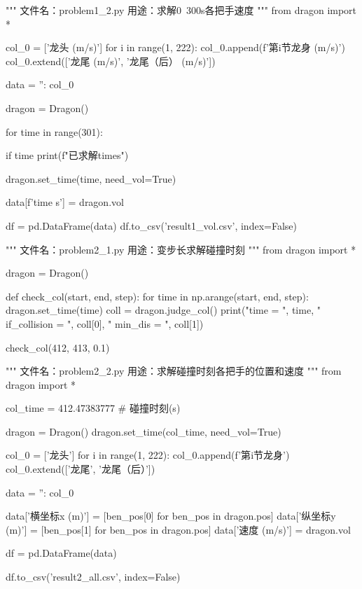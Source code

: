 \documentclass[withoutpreface,bwprint]{cumcmthesis}
\begin{document}
\begin{CodeText}
"""
文件名：problem1_2.py
用途：求解0~300s各把手速度
"""
from dragon import *

col_0 = ['龙头 (m/s)']
for i in range(1, 222):
      col_0.append(f'第{i}节龙身 (m/s)')
col_0.extend(['龙尾 (m/s)', '龙尾（后） (m/s)'])

data = {'': col_0}

dragon = Dragon()

for time in range(301):

      if time %
         print(f"已求解{time}s")


      dragon.set_time(time, need_vol=True)

      data[f'{time} s'] = dragon.vol

df = pd.DataFrame(data)
df.to_csv('result1_vol.csv', index=False)
\end{CodeText}
\begin{CodeText}
"""
文件名：problem2_1.py
用途：变步长求解碰撞时刻
"""
from dragon import *

dragon = Dragon()

def check_col(start, end, step):
      for time in np.arange(start, end, step):
         dragon.set_time(time)
         coll = dragon.judge_col()
         print("time = ", time, " if_collision = ", coll[0], " min_dis = ", coll[1])

check_col(412, 413, 0.1)
\end{CodeText}
\begin{CodeText}
"""
文件名：problem2_2.py
用途：求解碰撞时刻各把手的位置和速度
"""
from dragon import *

col_time = 412.47383777 # 碰撞时刻(s)

dragon = Dragon()
dragon.set_time(col_time, need_vol=True)

col_0 = ['龙头']
for i in range(1, 222):
      col_0.append(f'第{i}节龙身')
col_0.extend(['龙尾', '龙尾（后）'])

data = {'': col_0}

data['横坐标x (m)'] = [ben_pos[0] for ben_pos in dragon.pos]
data['纵坐标y (m)'] = [ben_pos[1] for ben_pos in dragon.pos]
data['速度 (m/s)'] = dragon.vol

df = pd.DataFrame(data)

df.to_csv('result2_all.csv', index=False)
\end{CodeText}
\end{document}
